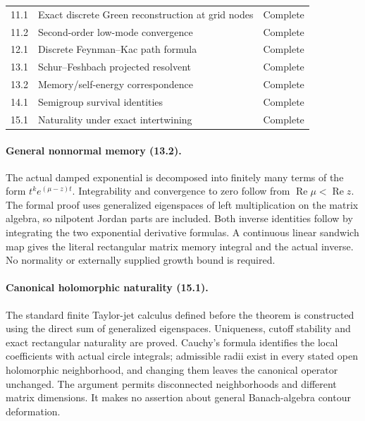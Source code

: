 \begin{longtable}{@{}p{}p{}p{}@{}}
11.1 & Exact discrete Green reconstruction at grid nodes & Complete\\
11.2 & Second-order low-mode convergence & Complete\\
12.1 & Discrete Feynman--Kac path formula & Complete\\
13.1 & Schur--Feshbach projected resolvent & Complete\\
13.2 & Memory/self-energy correspondence & Complete\\
14.1 & Semigroup survival identities & Complete\\
15.1 & Naturality under exact intertwining & Complete\\
\end{longtable}
\normalsize

\paragraph{General nonnormal memory (13.2).}
The actual damped exponential is decomposed into finitely many terms of the form
$t^k e^{(\mu-z)t}$. Integrability and convergence to zero follow from
$\operatorname{Re}\mu<\operatorname{Re}z$. The formal proof uses generalized
eigenspaces of left multiplication on the matrix algebra, so nilpotent Jordan
parts are included. Both inverse identities follow by integrating the two
exponential derivative formulas. A continuous linear sandwich map gives the
literal rectangular matrix memory integral and the actual inverse. No normality
or externally supplied growth bound is required.

\paragraph{Canonical holomorphic naturality (15.1).}
The standard finite Taylor-jet calculus defined before the theorem is constructed
using the direct sum of generalized eigenspaces. Uniqueness, cutoff stability and
exact rectangular naturality are proved. Cauchy's formula identifies the local
coefficients with actual circle integrals; admissible radii exist in every stated
open holomorphic neighborhood, and changing them leaves the canonical operator
unchanged. The argument permits disconnected neighborhoods and different matrix
dimensions. It makes no assertion about general Banach-algebra contour deformation.

